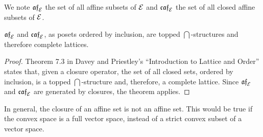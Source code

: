 \begin{mathSection}
\begin{defn}
	We note $\mathfrak{af}_{\mathcal{E}}$ the set of all affine subsets of $\mathcal{E}$ and $\mathfrak{caf}_{\mathcal{E}}$ the set of all closed affine subsets of $\mathcal{E}$.
\end{defn}

\begin{prop}
	$\mathfrak{af}_{\mathcal{E}}$ and $\mathfrak{caf}_{\mathcal{E}}$, as posets ordered by inclusion, are topped $\bigcap$-structures and therefore complete lattices.
\end{prop}

\begin{proof}
	Theorem 7.3 in Davey and Priestley's ``Introduction to Lattice and Order'' states that, given a closure operator, the set of all closed sets, ordered by inclusion, is a topped $\bigcap$-structure and, therefore, a complete lattice. Since $\mathfrak{af}_{\mathcal{E}}$ and $\mathfrak{caf}_{\mathcal{E}}$ are generated by closures, the theorem applies.
\end{proof}

\end{mathSection}

In general, the closure of an affine set is not an affine set. This would be true if the convex space is a full vector space, instead of a strict convex subset of a vector space.

